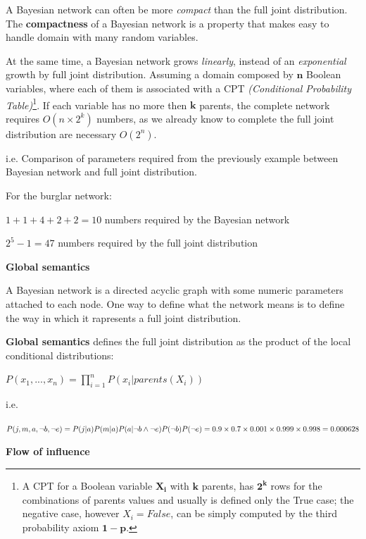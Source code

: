 A Bayesian network can often be more \textit{compact} than the full joint distribution. The \textbf{compactness} of a Bayesian network is a property that makes easy to handle
domain with many random variables. \vspace{3.5pt}

At the same time, a Bayesian network grows \textit{linearly}, instead of an \textit{exponential} growth by full joint distribution. Assuming a domain composed by $\mathbf{n}$ Boolean
variables, where each of them is associated with a CPT \textit{(Conditional Probability Table)}\footnote{A CPT for a Boolean variable $\mathbf{X_i}$ with $\mathbf{k}$ parents, has $\mathbf{2^k}$
rows for the combinations of parents values and usually is defined only the True case; the negative case, however $X_i = False$, can be simply computed by the third probability axiom $\mathbf{1 - p}$.}.
If each variable has no more then $\mathbf{k}$ parents, the complete network requires $O(n \times 2^k)$ numbers, as we already know to complete the full joint distribution are necessary
$O(2^n)$.
\begin{example}
    i.e. Comparison of parameters required from the previously example between Bayesian network and full joint distribution. \vspace{3.5pt}

    For the burglar network: \vspace{3.5pt}

    $1 + 1 + 4 + 2 + 2 = 10$ numbers required by the Bayesian network \vspace{3.5pt}

    $2^5 - 1 = 47$ numbers required by the full joint distribution
\end{example}
\textbf{Global semantics} \vspace{3.5pt}

A Bayesian network is a directed acyclic graph with some numeric parameters attached to each node. One way to define what the network means is to define the way in which 
it rapresents a full joint distribution. 
\begin{definition}
    \textbf{Global semantics} defines the full joint distribution as the product of the local conditional distributions:
    \begin{center}
        $P(x_1, ..., x_n) = \prod_{i = 1}^{n} P(x_i|parents(X_i))$
    \end{center}
\end{definition}
\begin{example}
    i.e. 
    
    $P(j, m, a, \neg b, \neg e) \\
    = P(j|a)P(m|a)P(a|\neg b \wedge \neg e)P(\neg b)P(\neg e) \\
    = 0.9 \times 0.7 \times 0.001 \times 0.999 \times 0.998 = 0.000628$
\end{example}
\textbf{Flow of influence} \vspace{3.5pt}

